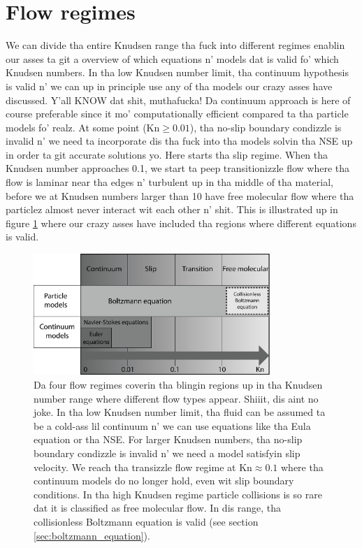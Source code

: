\section{Flow regimes}
We can divide tha entire Knudsen range tha fuck into different regimes enablin our asses ta git a overview of which equations n' models dat is valid fo' which Knudsen numbers. In tha low Knudsen number limit, tha continuum hypothesis is valid n' we can up in principle use any of tha models our crazy asses have discussed. Y'all KNOW dat shit, muthafucka! Da continuum approach is here of course preferable since it mo' computationally efficient compared ta tha particle models fo' realz. At some point (Kn$\geq 0.01$), tha no-slip boundary condizzle is invalid n' we need ta incorporate dis tha fuck into tha models solvin tha NSE up in order ta git accurate solutions yo. Here starts tha slip regime. When tha Knudsen number approaches 0.1, we start ta peep transitionizzle flow where tha flow is laminar near tha edges n' turbulent up in tha middle of tha material, before we at Knudsen numbers larger than 10 have free molecular flow where tha particlez almost never interact wit each other n' shit. This is illustrated up in figure \ref{fig:flow_regimes} where our crazy asses have included tha regions where different equations is valid.
\begin{figure}[h!]
\begin{center}
\includegraphics[width=0.8\textwidth, trim=0cm 0cm 0cm 0cm, clip]{figures/flowregimes.eps}
\end{center}
\caption{Da four flow regimes coverin tha blingin regions up in tha Knudsen number range where different flow types appear. Shiiit, dis aint no joke. In tha low Knudsen number limit, tha fluid can be assumed ta be a cold-ass lil continuum n' we can use equations like tha Eula equation or tha NSE. For larger Knudsen numbers, tha no-slip boundary condizzle is invalid n' we need a model satisfyin slip velocity. We reach tha transizzle flow regime at Kn$\approx 0.1$ where tha continuum models do no longer hold, even wit slip boundary conditions. In tha high Knudsen regime particle collisions is so rare dat it is classified as free molecular flow. In dis range, tha collisionless Boltzmann equation is valid (see section \ref{sec:boltzmann_equation}).}
\label{fig:flow_regimes}
\end{figure}